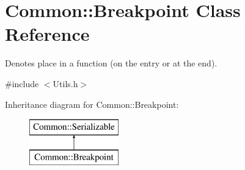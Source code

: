 \hypertarget{class_common_1_1_breakpoint}{\section{Common\-:\-:Breakpoint Class Reference}
\label{class_common_1_1_breakpoint}
}


Denotes place in a function (on the entry or at the end).  




{\ttfamily \#include $<$Utils.\-h$>$}

Inheritance diagram for Common\-:\-:Breakpoint\-:\begin{figure}[H]
\begin{center}
\leavevmode
\includegraphics[height=2.000000cm]{class_common_1_1_breakpoint}
\end{center}
\end{figure}
